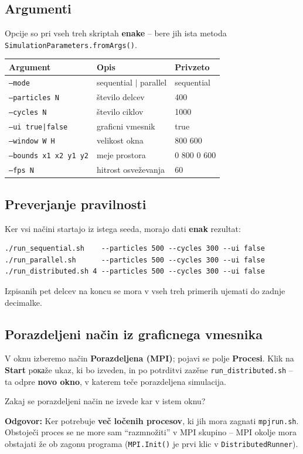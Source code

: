 \documentclass[12pt,a4paper]{article}
\begin{document}
\subsection{Argumenti}
Opcije so pri vseh treh skriptah \textbf{enake} -- bere jih ista metoda \texttt{SimulationParameters.fromArgs()}.
\begin{center}
\begin{tabular}{|l|l|l|}
\hline
\textbf{Argument} & \textbf{Opis} & \textbf{Privzeto} \\
\hline
\texttt{--mode} & sequential $|$ parallel & sequential \\
\texttt{--particles N} & \v{s}tevilo delcev & 400 \\
\texttt{--cycles N} & \v{s}tevilo ciklov & 1000 \\
\texttt{--ui true|false} & graficni vmesnik & true \\
\texttt{--window W H} & velikost okna & 800 600 \\
\texttt{--bounds x1 x2 y1 y2} & meje prostora & 0 800 0 600 \\
\texttt{--fps N} & hitrost osve\v{z}evanja & 60 \\
\hline
\end{tabular}
\end{center}

\subsection{Preverjanje pravilnosti}
Ker vsi na\v{c}ini startajo iz istega seeda, morajo dati \textbf{enak} rezultat:
\begin{verbatim}
./run_sequential.sh    --particles 500 --cycles 300 --ui false
./run_parallel.sh      --particles 500 --cycles 300 --ui false
./run_distributed.sh 4 --particles 500 --cycles 300 --ui false
\end{verbatim}
Izpisanih pet delcev na koncu se mora v vseh treh primerih ujemati do zadnje decimalke.

\subsection{Porazdeljeni na\v{c}in iz graficnega vmesnika}
V oknu izberemo na\v{c}in \textbf{Porazdeljena (MPI)}; pojavi se polje \textbf{Procesi}. Klik na \textbf{Start} pока\v{z}e ukaz, ki bo izveden, in po potrditvi zaz\v{e}ne \texttt{run\_distributed.sh} -- ta odpre \textbf{novo okno}, v katerem te\v{c}e porazdeljena simulacija.

\begin{vprasanje}
Zakaj se porazdeljeni na\v{c}in ne izvede kar v istem oknu?

\textbf{Odgovor:} Ker potrebuje \textbf{ve\v{c} lo\v{c}enih procesov}, ki jih mora zagnati \texttt{mpjrun.sh}. Obstoje\v{c}i proces se ne more sam ``razmno\v{z}iti'' v MPI skupino -- MPI okolje mora obstajati \v{z}e ob zagonu programa (\texttt{MPI.Init()} je prvi klic v \texttt{DistributedRunner}).
\end{vprasanje}
\end{document}
